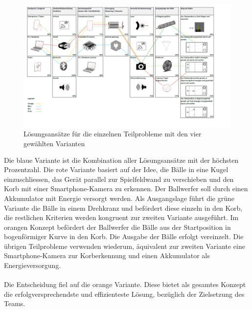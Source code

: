 \begin{figure}[t]
	\centering
	\includegraphics[width=1.08\textwidth]{Enddokumentation/Varianten/Bilder/Grobkonzept.png}
	\caption{Lösungsansätze für die einzelnen Teilprobleme mit den vier gewählten Varianten}
	\label{fig:Grobkonzept}
\end{figure}
\noindent Die blaue Variante ist die Kombination aller Lösungsansätze mit der höchsten
Prozentzahl. Die rote Variante basiert auf der Idee, die Bälle in eine Kugel einzuschliessen,
das Gerät parallel zur Spielfeldwand zu verschieben und den Korb mit einer Smartphone-Kamera zu
erkennen. Der Ballwerfer soll durch einen Akkumulator mit Energie versorgt werden. Als
Ausgangslage führt die grüne Variante die Bälle in einem Drehkranz und befördert diese einzeln
in den Korb, die restlichen Kriterien werden kongruent zur zweiten Variante ausgeführt. Im
orangen Konzept befördert der Ballwerfer die Bälle aus der Startposition in bogenförmiger Kurve in den Korb. Die Ausgabe der Bälle erfolgt vereinzelt. Die übrigen Teilprobleme verwenden
wiederum, äquivalent zur zweiten Variante eine Smartphone-Kamera zur Korberkennung und einen
Akkumulator als Energieversorgung.\\
\\
Die Entscheidung fiel auf die orange Variante. Diese bietet als gesamtes Konzept die
erfolgversprechendste und effizienteste Lösung, bezüglich der Zielsetzung des Teams. \\


